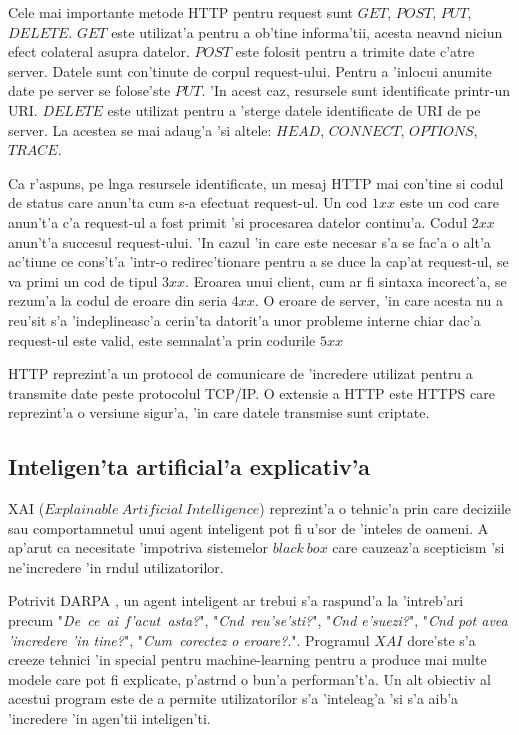 \documentclass[12pt,a4paper,twoside]{report}
\begin{document}
Cele mai importante metode HTTP pentru request sunt $GET$, $POST$, $PUT$, $DELETE$.
 $GET$ este utilizat'a pentru a ob'tine informa'tii, acesta neav\ia nd niciun efect colateral asupra datelor.
 $POST$ este folosit pentru a trimite date c'atre server. Datele sunt con'tinute de corpul request-ului.
 Pentru a 'inlocui anumite date pe server se folose'ste $PUT$. 'In acest caz, resursele sunt identificate printr-un URI. $DELETE$ este utilizat pentru a 'sterge datele identificate de URI de pe server.
La acestea se mai adaug'a 'si altele: $HEAD$, $CONNECT$, $OPTIONS$, $TRACE$.

Ca r'aspuns, pe l\ia nga resursele identificate, un mesaj HTTP mai con'tine si codul de status care anun'ta cum s-a efectuat request-ul. Un cod $1xx$ este un cod care anun't'a c'a request-ul a fost primit 'si procesarea datelor continu'a. Codul $2xx$ anun't'a succesul request-ului. 'In cazul 'in care este necesar s'a se fac'a o alt'a ac'tiune ce cons't'a 'intr-o redirec'tionare pentru a se duce la cap'at request-ul, se va primi un cod de tipul $3xx$. Eroarea unui client, cum ar fi sintaxa incorect'a, se rezum'a la codul de eroare din seria $4xx$. O eroare de server, 'in care acesta nu a reu'sit s'a 'indeplineasc'a cerin'ta datorit'a unor probleme interne chiar dac'a request-ul este valid, este semnalat'a prin codurile $5xx$

HTTP reprezint'a un protocol de comunicare de 'incredere utilizat pentru a transmite date peste protocolul TCP/IP. O extensie a HTTP este HTTPS care reprezint'a o versiune sigur'a, 'in care datele transmise sunt criptate.


\subsection{Inteligen'ta artificial'a explicativ'a}

XAI ($Explainable\ Artificial\ Intelligence$) reprezint'a o tehnic'a prin care deciziile sau comportamnetul unui agent inteligent pot fi u'sor de 'inteles de oameni. A ap'arut ca necesitate 'impotriva sistemelor $black\ box$ care cauzeaz'a scepticism 'si ne'incredere 'in r\ia ndul utilizatorilor.

Potrivit DARPA \cite{darpaXAI}, un agent inteligent ar trebui s'a raspund'a la 'intreb'ari precum 
"{\it De\ ce\ ai\ f'acut\ asta?}", 
"{\it C\ia nd\ reu'se'sti?}", 
"{\it C\ia nd e'suezi?}", 
"{\it C\ia nd pot avea 'incredere 'in tine?}", 
"{\it Cum\ corectez o eroare?}.". Programul $XAI$ dore'ste s'a creeze tehnici 'in special pentru machine-learning pentru a produce mai multe modele care pot fi explicate, p'astr\ia nd o bun'a performan't'a. Un alt obiectiv al acestui program este de a permite utilizatorilor s'a 'inteleag'a 'si s'a aib'a 'incredere 'in agen'tii inteligen'ti.
\end{document}
